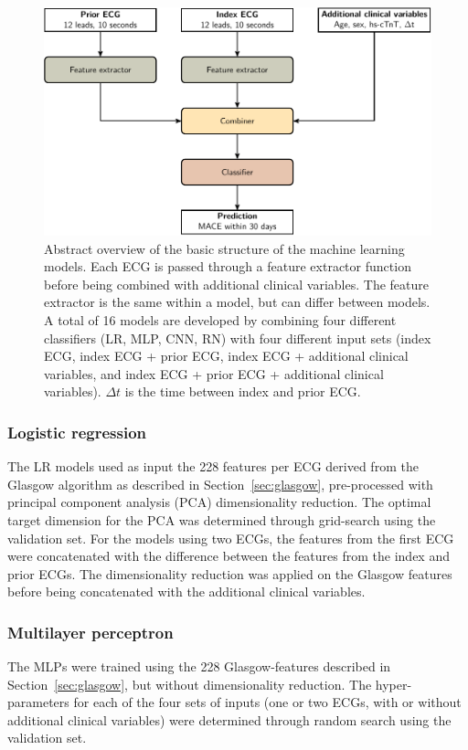 \documentclass[preprint]{elsarticle}
\begin{document}
\begin{figure}[h!]
\includegraphics[width=\linewidth]{figures/overview.pdf}
\centering
\caption{Abstract overview of the basic structure of the machine learning models. Each ECG is passed through a feature extractor function before being combined with additional clinical variables. The feature extractor is the same within a model, but can differ between models. A total of 16 models are developed by combining four different classifiers (LR, MLP, CNN, RN) with four different input sets (index ECG, index ECG + prior ECG, index ECG + additional clinical variables, and index ECG + prior ECG + additional clinical variables). $\Delta t$ is the time between index and prior ECG.}

\label{fig:model:overview}
\end{figure}

\subsubsection{Logistic regression}
The LR models used as input the 228 features per ECG derived from the Glasgow algorithm as described in Section~\ref{sec:glasgow}, pre-processed with principal component analysis (PCA) dimensionality reduction. The optimal target dimension for the PCA was determined through grid-search using the validation set. For the models using two ECGs, the features from the first ECG were concatenated with the difference between the features from the index and prior ECGs. The dimensionality reduction was applied on the Glasgow features before being concatenated with the additional clinical variables.

\subsubsection{Multilayer perceptron}
The MLPs were trained using the 228 Glasgow-features described in Section~\ref{sec:glasgow}, but without dimensionality reduction. The hyper-parameters for each of the four sets of inputs (one or two ECGs, with or without additional clinical variables) were determined through random search using the validation set.
\end{document}
